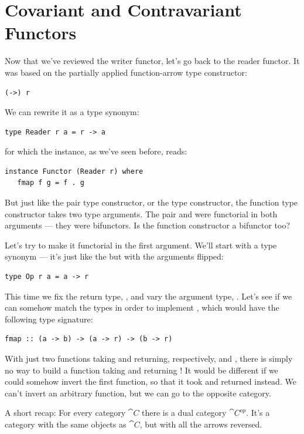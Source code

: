 \section{Covariant and Contravariant Functors}

Now that we've reviewed the writer functor, let's go back to the reader
functor. It was based on the partially applied function-arrow type
constructor:

\begin{Verbatim}
(->) r
\end{Verbatim}
We can rewrite it as a type synonym:

\begin{Verbatim}
type Reader r a = r -> a
\end{Verbatim}
for which the  instance, as we've seen before, reads:

\begin{Verbatim}
instance Functor (Reader r) where
   fmap f g = f . g
\end{Verbatim}
But just like the pair type constructor, or the  type
constructor, the function type constructor takes two type arguments. The
pair and  were functorial in both arguments --- they were
bifunctors. Is the function constructor a bifunctor too?

Let's try to make it functorial in the first argument. We'll start with
a type synonym --- it's just like the  but with the
arguments flipped:

\begin{Verbatim}
type Op r a = a -> r
\end{Verbatim}
This time we fix the return type, , and vary the argument
type, . Let's see if we can somehow match the types in order
to implement , which would have the following type
signature:

\begin{Verbatim}
fmap :: (a -> b) -> (a -> r) -> (b -> r)
\end{Verbatim}
With just two functions taking  and returning, respectively,
 and , there is simply no way to build a function
taking  and returning ! It would be different if we
could somehow invert the first function, so that it took  and
returned  instead. We can't invert an arbitrary function, but
we can go to the opposite category.

A short recap: For every category $\cat{C}$ there is a dual category
$\cat{C}^{op}$. It's a category with the same objects as
$\cat{C}$, but with all the arrows reversed.


